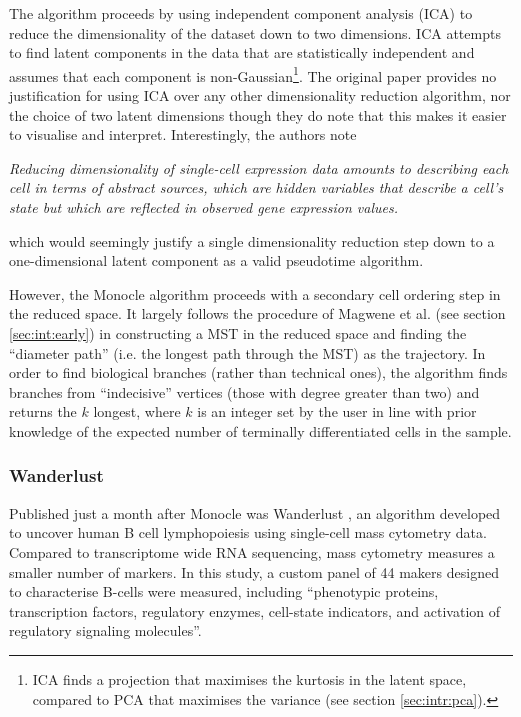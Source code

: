 The algorithm proceeds by using independent component analysis (ICA) to reduce the dimensionality of the dataset down to two dimensions. ICA attempts to find latent components in the data that are statistically independent and assumes that each component is non-Gaussian\footnote{
ICA finds a projection that maximises the kurtosis in the latent space, compared to PCA that maximises the variance (see section \ref{sec:intr:pca}).
}. The original paper provides no justification for using ICA over any other dimensionality reduction algorithm, nor the choice of two latent dimensions though they do note that this makes it easier to visualise and interpret. Interestingly, the authors note

\begin{displayquote}
\emph{Reducing dimensionality of single-cell expression data amounts to describing
each cell in terms of abstract sources, which are hidden variables that
describe a cell’s state but which are reflected in observed gene expression
values.}
\end{displayquote}

which would seemingly justify a single dimensionality reduction step down to a one-dimensional latent component as a valid pseudotime algorithm.

However, the Monocle algorithm proceeds with a secondary cell ordering step in the reduced space. It largely follows the procedure of Magwene et al. \cite{Magwene2003-bm} (see section \ref{sec:int:early}) in constructing a MST in the reduced space and finding the ``diameter path'' (i.e. the longest path through the MST) as the trajectory. In order to find biological branches (rather than technical ones), the algorithm finds branches from ``indecisive'' vertices (those with degree greater than two) and returns the $k$ longest, where $k$ is an integer set by the user in line with prior knowledge of the expected number of terminally differentiated cells in the sample.

\subsubsection{Wanderlust}

Published just a month after Monocle was Wanderlust \cite{Bendall2014}, an algorithm developed to uncover human B cell lymphopoiesis using single-cell mass cytometry data. Compared to transcriptome wide RNA sequencing, mass cytometry measures a smaller number of markers. In this study, a custom panel of 44 makers designed to characterise B-cells were measured, including ``phenotypic proteins, transcription factors, regulatory enzymes, cell-state indicators, and activation of regulatory signaling molecules''.

